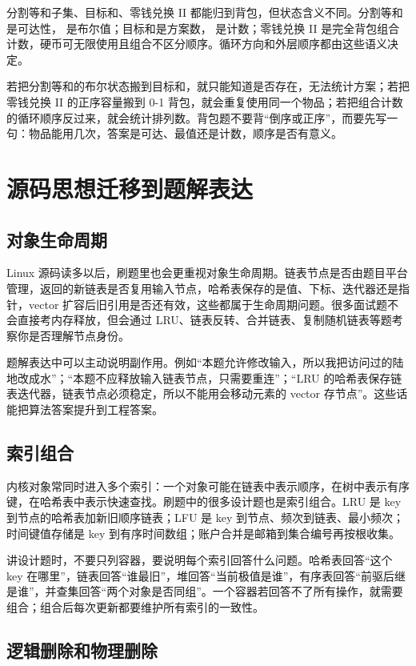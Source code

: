 分割等和子集、目标和、零钱兑换 II 都能归到背包，但状态含义不同。分割等和是可达性， 是布尔值；目标和是方案数， 是计数；零钱兑换 II 是完全背包组合计数，硬币可无限使用且组合不区分顺序。循环方向和外层顺序都由这些语义决定。

若把分割等和的布尔状态搬到目标和，就只能知道是否存在，无法统计方案；若把零钱兑换 II 的正序容量搬到 0-1 背包，就会重复使用同一个物品；若把组合计数的循环顺序反过来，就会统计排列数。背包题不要背“倒序或正序”，而要先写一句：物品能用几次，答案是可达、最值还是计数，顺序是否有意义。

\section{源码思想迁移到题解表达}

\subsection{对象生命周期}

Linux 源码读多以后，刷题里也会更重视对象生命周期。链表节点是否由题目平台管理，返回的新链表是否复用输入节点，哈希表保存的是值、下标、迭代器还是指针，vector 扩容后旧引用是否还有效，这些都属于生命周期问题。很多面试题不会直接考内存释放，但会通过 LRU、链表反转、合并链表、复制随机链表等题考察你是否理解节点身份。

题解表达中可以主动说明副作用。例如“本题允许修改输入，所以我把访问过的陆地改成水”；“本题不应释放输入链表节点，只需要重连”；“LRU 的哈希表保存链表迭代器，链表节点必须稳定，所以不能用会移动元素的 vector 存节点”。这些话能把算法答案提升到工程答案。

\subsection{索引组合}

内核对象常同时进入多个索引：一个对象可能在链表中表示顺序，在树中表示有序键，在哈希表中表示快速查找。刷题中的很多设计题也是索引组合。LRU 是 key 到节点的哈希表加新旧顺序链表；LFU 是 key 到节点、频次到链表、最小频次；时间键值存储是 key 到有序时间数组；账户合并是邮箱到集合编号再按根收集。

讲设计题时，不要只列容器，要说明每个索引回答什么问题。哈希表回答“这个 key 在哪里”，链表回答“谁最旧”，堆回答“当前极值是谁”，有序表回答“前驱后继是谁”，并查集回答“两个对象是否同组”。一个容器若回答不了所有操作，就需要组合；组合后每次更新都要维护所有索引的一致性。

\subsection{逻辑删除和物理删除}

